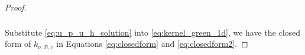 \documentclass[10pt,a4paper]{amsart}
\newcommand{\Real}{\mathbb R}
\begin{document}
\begin{proof}
\begin{align}
\begin{split}
\end{split}
\label{eq:u_p_u_h_solution}
\end{align}
Substitute \eqref{eq:u_p_u_h_solution} into \eqref{eq:kernel_green_1d}, we have the closed form of $k_{\nu,\mathcal{B},c}$ in Equations \eqref{eq:closedform} and \eqref{eq:closedform2}.
\end{proof}
\end{document}

